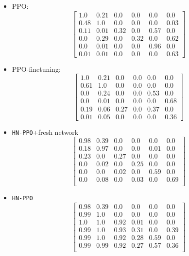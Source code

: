 \documentclass[dvipsnames]{article} %
\begin{document}
\begin{itemize}
\item PPO:
\[\left[\begin{array}{cccccc}
1.0& 0.21& 0.0& 0.0& 0.0& 0.0\\
0.48& 1.0& 0.0& 0.0& 0.0& 0.03\\
0.11& 0.01& 0.32& 0.0& 0.57& 0.0\\
0.0& 0.29& 0.0& 0.32& 0.0& 0.62\\
0.0& 0.01& 0.0& 0.0& 0.96& 0.0\\
0.01& 0.01& 0.0& 0.0& 0.0& 0.63
\end{array}\right]\]

\item PPO-finetuning:
\[\left[\begin{array}{cccccc}
1.0& 0.21& 0.0& 0.0& 0.0& 0.0\\
0.61& 1.0& 0.0& 0.0& 0.0& 0.0\\
0.0& 0.24& 0.0& 0.0& 0.53& 0.0\\
0.0& 0.01& 0.0& 0.0& 0.0& 0.68\\
0.19& 0.06& 0.27& 0.0& 0.37& 0.0\\
0.01& 0.05& 0.0& 0.0& 0.0& 0.36
\end{array}\right]\]

\item \texttt{HN-PPO}+fresh network
\[\left[\begin{array}{cccccc}
0.98 & 0.39 & 0.0 & 0.0 & 0.0 & 0.0 \\
0.18 & 0.97 & 0.0 & 0.0 & 0.01 & 0.0 \\
0.23 & 0.0 & 0.27 & 0.0 & 0.0 & 0.0 \\
0.0 & 0.02 & 0.0 & 0.25 & 0.0 & 0.0 \\
0.0 & 0.0 & 0.02 & 0.0 & 0.59 & 0.0 \\
0.0 & 0.08 & 0.0 & 0.03 & 0.0 & 0.69\\
\end{array}\right]\]

\item \texttt{HN-PPO}
\[\left[\begin{array}{cccccc}
0.98 & 0.39 & 0.0  & 0.0  & 0.0  & 0.0\\
0.99 & 1.0  & 0.0  & 0.0  & 0.0  & 0.0\\
1.0  & 1.0  & 0.92 & 0.01 & 0.0  & 0.0\\
0.99 & 1.0  & 0.93 & 0.31 & 0.0  & 0.39\\
0.99 & 1.0  & 0.92 & 0.28 & 0.59 & 0.0\\
0.99 & 0.99 & 0.92 & 0.27 & 0.57 & 0.36\\
\end{array}\right]\]


\end{itemize}
\end{document}

